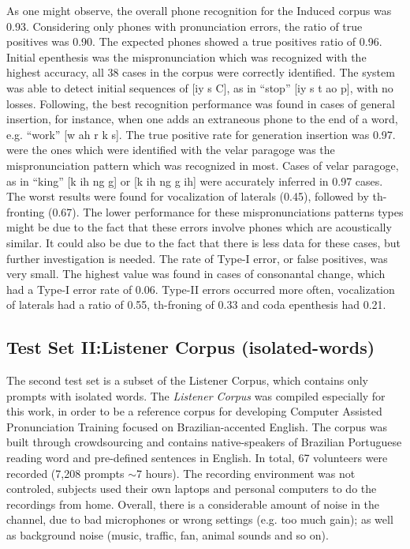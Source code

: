 \documentclass[twocolumn]{bmcart}%
\begin{document}
As one might observe, the overall phone recognition for the Induced corpus was 0.93. Considering only phones with pronunciation errors, the ratio of true positives was 0.90. The expected phones showed a true positives ratio of 0.96. Initial epenthesis was the mispronunciation which was recognized with the highest accuracy, all 38 cases in the corpus were correctly identified. The system was able to detect initial sequences of [iy s C], as in ``stop'' [iy s t ao p], with no losses. Following, the best recognition performance was found in cases of general insertion, for instance, when one adds an extraneous phone to the end of a word, e.g. ``work'' [w ah r k s]. The true positive rate for generation insertion was 0.97. were the ones which were identified with the  velar paragoge was the mispronunciation pattern which was recognized in most. Cases of velar paragoge, as in ``king'' [k ih ng g] or [k ih ng g ih] were accurately inferred in 0.97 cases. The worst results were found for vocalization of laterals (0.45), followed by th-fronting (0.67). The lower performance for these mispronunciations patterns types might be due to the fact that these errors involve phones which are acoustically similar. It could also be due to the fact that there is less data for these cases, but further investigation is needed. The rate of Type-I error, or false positives, was very small. The highest value was found in cases of consonantal change, which had a Type-I error rate of 0.06. Type-II errors occurred more often, vocalization of laterals had a ratio of 0.55, th-froning of 0.33 and coda epenthesis had 0.21.

\subsection*{\textbf{Test Set II:Listener Corpus (isolated-words)}}

The second test set is a subset of the Listener Corpus, which contains only prompts with isolated words. The \emph{Listener Corpus} was compiled especially for this work, in order to be a reference corpus for developing Computer Assisted Pronunciation Training focused on Brazilian-accented English. The corpus was built through crowdsourcing and contains native-speakers of Brazilian Portuguese reading word and pre-defined sentences in English. In total, 67 volunteers were recorded (7,208 prompts $\sim$7 hours). The recording environment was not controled, subjects used their own laptops and personal computers to do the recordings from home. Overall, there is a considerable amount of noise in the channel, due to bad microphones or wrong settings (e.g. too much gain); as well as background noise (music, traffic, fan, animal sounds and so on). 
\end{document}
